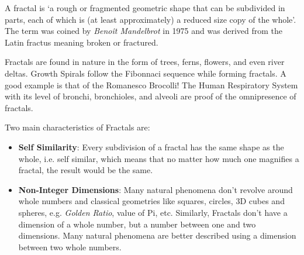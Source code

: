 \documentclass{resonance}
\begin{document}
	
	A fractal is ‘a rough or fragmented geometric shape that can be subdivided in parts, each of which is (at least approximately) a reduced size copy of the whole’. The term was coined by \textit{Benoît Mandelbrot} in 1975 and was derived from the Latin fractus meaning broken or fractured.
	
	Fractals are found in nature in the form of trees, ferns, flowers, and even river deltas. Growth Spirals follow the Fibonnaci sequence while forming fractals. A good example is that of the Romanesco Brocolli! The Human Respiratory System with its level of bronchi, bronchioles, and alveoli are proof of the omnipresence of fractals.
	
	Two main characteristics of Fractals are:
	\begin{itemize}
		\item \textbf{Self Similarity}: Every subdivision of a fractal has the same shape as the whole, i.e. self similar, which means that no matter how much one magnifies a fractal, the result would be the same.
		
		
		\item \textbf{Non-Integer Dimensions}: Many natural phenomena don’t revolve around whole numbers and classical geometries like squares, circles, 3D cubes and spheres, e.g. \textit{Golden Ratio}, value of Pi, etc. Similarly, Fractals don’t have a dimension of a whole number, but a number between one and two dimensions. Many natural phenomena are better described using a dimension between two whole numbers.
	\end{itemize}
	
\end{document}
